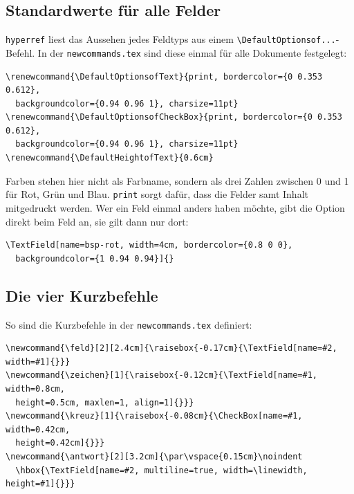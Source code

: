 \begin{Form}
\subsection{Standardwerte für alle Felder}

\texttt{hyperref} liest das Aussehen jedes Feldtyps aus einem
\verb|\DefaultOptionsof...|-Befehl. In der \texttt{newcommands.tex} sind diese
einmal für alle Dokumente festgelegt:

\begin{lstlisting}[style=latex]
\renewcommand{\DefaultOptionsofText}{print, bordercolor={0 0.353 0.612},
  backgroundcolor={0.94 0.96 1}, charsize=11pt}
\renewcommand{\DefaultOptionsofCheckBox}{print, bordercolor={0 0.353 0.612},
  backgroundcolor={0.94 0.96 1}, charsize=11pt}
\renewcommand{\DefaultHeightofText}{0.6cm}
\end{lstlisting}


Farben stehen hier nicht als Farbname, sondern als drei Zahlen zwischen 0 und
1 für Rot, Grün und Blau. \texttt{print} sorgt dafür, dass die Felder samt
Inhalt mitgedruckt werden. Wer ein Feld einmal anders haben möchte, gibt die
Option direkt beim Feld an, sie gilt dann nur dort:

\begin{lstlisting}[style=latex]
\TextField[name=bsp-rot, width=4cm, bordercolor={0.8 0 0},
  backgroundcolor={1 0.94 0.94}]{}
\end{lstlisting}

\begin{ausgabe}
\TextField[name=bsp-rot, width=4cm, bordercolor={0.8 0 0},
  backgroundcolor={1 0.94 0.94}]{}
\end{ausgabe}


\subsection{Die vier Kurzbefehle}

So sind die Kurzbefehle in der \texttt{newcommands.tex} definiert:

\begin{lstlisting}[style=latex]
\newcommand{\feld}[2][2.4cm]{\raisebox{-0.17cm}{\TextField[name=#2, width=#1]{}}}
\newcommand{\zeichen}[1]{\raisebox{-0.12cm}{\TextField[name=#1, width=0.8cm,
  height=0.5cm, maxlen=1, align=1]{}}}
\newcommand{\kreuz}[1]{\raisebox{-0.08cm}{\CheckBox[name=#1, width=0.42cm,
  height=0.42cm]{}}}
\newcommand{\antwort}[2][3.2cm]{\par\vspace{0.15cm}\noindent
  \hbox{\TextField[name=#2, multiline=true, width=\linewidth, height=#1]{}}}
\end{lstlisting}



\end{Form}

